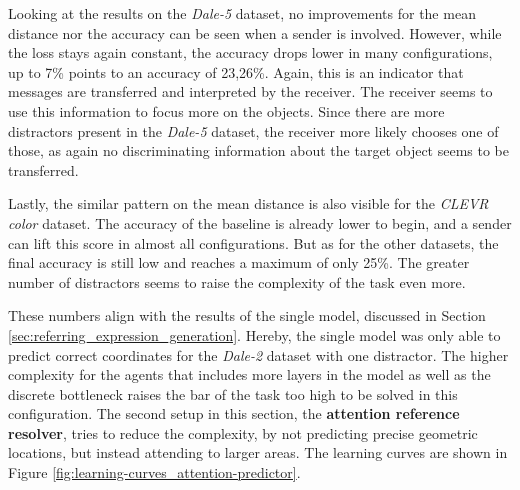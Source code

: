 Looking at the results on the \emph{Dale-5} dataset, no improvements for the mean distance nor the accuracy can be seen when a sender is involved.
However, while the loss stays again constant, the accuracy drops lower in many configurations, up to 7\% points to an accuracy of 23,26\%.
Again, this is an indicator that messages are transferred and interpreted by the receiver.
The receiver seems to use this information to focus more on the objects.
Since there are more distractors present in the \emph{Dale-5} dataset, the receiver more likely chooses one of those, as again no discriminating information about the target object seems to be transferred.

Lastly, the similar pattern on the mean distance is also visible for the \emph{CLEVR color} dataset.
The accuracy of the baseline is already lower to begin, and a sender can lift this score in almost all configurations.
But as for the other datasets, the final accuracy is still low and reaches a maximum of only 25\%.
The greater number of distractors seems to raise the complexity of the task even more.

These numbers align with the results of the single model, discussed in Section \ref{sec:referring_expression_generation}.
Hereby, the single model was only able to predict correct coordinates for the \emph{Dale-2} dataset with one distractor.
The higher complexity for the agents that includes more layers in the model as well as the discrete bottleneck raises the bar of the task too high to be solved in this configuration.
The second setup in this section, the \textbf{attention reference resolver}, tries to reduce the complexity, by not predicting precise geometric locations, but instead attending to larger areas.
The learning curves are shown in Figure \ref{fig:learning-curves_attention-predictor}.

